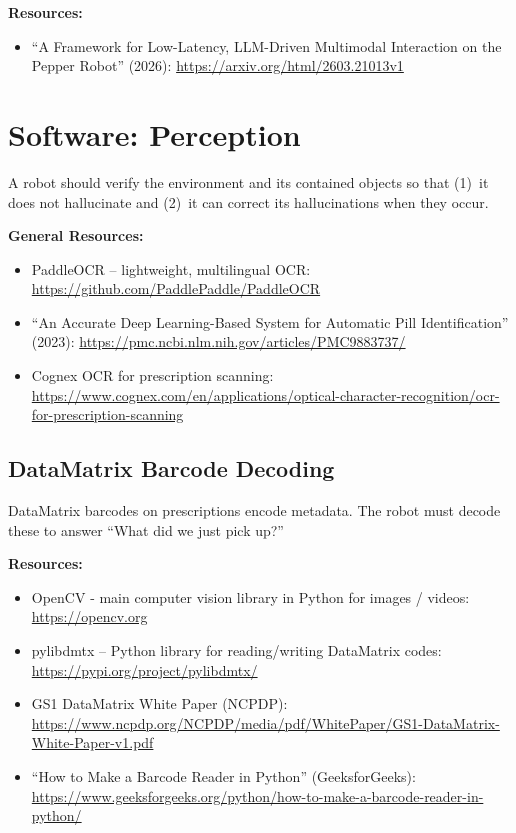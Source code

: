 \documentclass[11pt]{article}
\begin{document}
\textbf{Resources:}
\begin{itemize}[nosep]
    \item ``A Framework for Low-Latency, LLM-Driven Multimodal Interaction on the Pepper Robot'' (2026): \url{https://arxiv.org/html/2603.21013v1}
\end{itemize}

\section{Software: Perception}
\label{sec:perception}

A robot should verify the environment and its contained objects so that (1)~it does not hallucinate and (2)~it can correct its hallucinations when they occur.

\textbf{General Resources:}
\begin{itemize}[nosep]
    \item PaddleOCR -- lightweight, multilingual OCR: \url{https://github.com/PaddlePaddle/PaddleOCR}
    \item ``An Accurate Deep Learning-Based System for Automatic Pill Identification'' (2023): \url{https://pmc.ncbi.nlm.nih.gov/articles/PMC9883737/}
    \item Cognex OCR for prescription scanning: \url{https://www.cognex.com/en/applications/optical-character-recognition/ocr-for-prescription-scanning}
\end{itemize}

\subsection{DataMatrix Barcode Decoding}
DataMatrix barcodes on prescriptions encode metadata. The robot must decode these to answer ``What did we just pick up?''

\textbf{Resources:}
\begin{itemize}[nosep]
    \item OpenCV - main computer vision library in Python for images / videos: \url{https://opencv.org}
    \item pylibdmtx -- Python library for reading/writing DataMatrix codes: \url{https://pypi.org/project/pylibdmtx/}
    \item GS1 DataMatrix White Paper (NCPDP): \url{https://www.ncpdp.org/NCPDP/media/pdf/WhitePaper/GS1-DataMatrix-White-Paper-v1.pdf}
    \item ``How to Make a Barcode Reader in Python'' (GeeksforGeeks): \url{https://www.geeksforgeeks.org/python/how-to-make-a-barcode-reader-in-python/}
\end{itemize}
\end{document}
